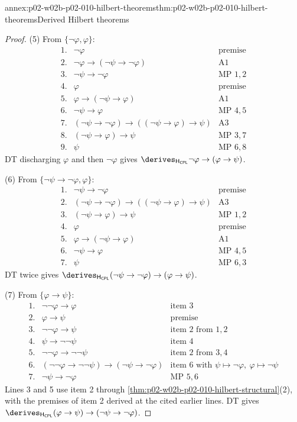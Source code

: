 \begin{annexitem}{annex:p02-w02b-p02-010-hilbert-theorems}{thm:p02-w02b-p02-010-hilbert-theorems}{Derived Hilbert theorems}
\begin{proof}
(5) From \(\{\neg\varphi,\varphi\}\):
\[
\begin{array}{rll}
1.&\neg\varphi&\text{premise}\\
2.&\neg\varphi\to(\neg\psi\to\neg\varphi)&\text{A1}\\
3.&\neg\psi\to\neg\varphi&\text{MP }1,2\\
4.&\varphi&\text{premise}\\
5.&\varphi\to(\neg\psi\to\varphi)&\text{A1}\\
6.&\neg\psi\to\varphi&\text{MP }4,5\\
7.&(\neg\psi\to\neg\varphi)\to((\neg\psi\to\varphi)\to\psi)&\text{A3}\\
8.&(\neg\psi\to\varphi)\to\psi&\text{MP }3,7\\
9.&\psi&\text{MP }6,8
\end{array}
\]
DT discharging \(\varphi\) and then \(\neg\varphi\) gives
\(\derives_{\mathsf H_{\mathsf{CPL}}}\neg\varphi\to(\varphi\to\psi)\).

(6) From \(\{\neg\psi\to\neg\varphi,\varphi\}\):
\[
\begin{array}{rll}
1.&\neg\psi\to\neg\varphi&\text{premise}\\
2.&(\neg\psi\to\neg\varphi)\to((\neg\psi\to\varphi)\to\psi)&\text{A3}\\
3.&(\neg\psi\to\varphi)\to\psi&\text{MP }1,2\\
4.&\varphi&\text{premise}\\
5.&\varphi\to(\neg\psi\to\varphi)&\text{A1}\\
6.&\neg\psi\to\varphi&\text{MP }4,5\\
7.&\psi&\text{MP }6,3
\end{array}
\]
DT twice gives
\(\derives_{\mathsf H_{\mathsf{CPL}}}(\neg\psi\to\neg\varphi)\to(\varphi\to\psi)\).

(7) From \(\{\varphi\to\psi\}\):
\[
\begin{array}{rll}
1.&\neg\neg\varphi\to\varphi&\text{item 3}\\
2.&\varphi\to\psi&\text{premise}\\
3.&\neg\neg\varphi\to\psi&\text{item 2 from }1,2\\
4.&\psi\to\neg\neg\psi&\text{item 4}\\
5.&\neg\neg\varphi\to\neg\neg\psi&\text{item 2 from }3,4\\
6.&(\neg\neg\varphi\to\neg\neg\psi)\to(\neg\psi\to\neg\varphi)
  &\text{item 6 with }\psi\mapsto\neg\varphi,\ \varphi\mapsto\neg\psi\\
7.&\neg\psi\to\neg\varphi&\text{MP }5,6
\end{array}
\]
Lines 3 and 5 use item 2 through
\cref{thm:p02-w02b-p02-010-hilbert-structural}(2), with the premises of
item 2 derived at the cited earlier lines.  DT gives
\(\derives_{\mathsf H_{\mathsf{CPL}}}(\varphi\to\psi)\to(\neg\psi\to\neg\varphi)\).


\end{proof}
\end{annexitem}
